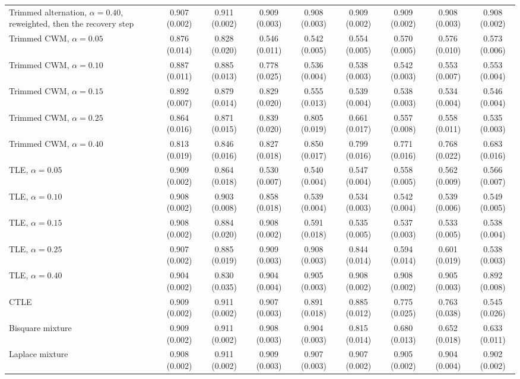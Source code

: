 \begin{table}[htbp]
{\begin{tabular}{lcccccccc}
Trimmed alternation, $\alpha=0.40$, reweighted, then the recovery step & 0.907 (0.002) & 0.911 (0.002) & 0.909 (0.003) & 0.908 (0.003) & 0.909 (0.002) & 0.909 (0.002) & 0.908 (0.003) & 0.908 (0.002) \\
Trimmed CWM, $\alpha=0.05$ & 0.876 (0.014) & 0.828 (0.020) & 0.546 (0.011) & 0.542 (0.005) & 0.554 (0.005) & 0.570 (0.005) & 0.576 (0.010) & 0.573 (0.006) \\
Trimmed CWM, $\alpha=0.10$ & 0.887 (0.011) & 0.885 (0.013) & 0.778 (0.025) & 0.536 (0.004) & 0.538 (0.003) & 0.542 (0.003) & 0.553 (0.007) & 0.553 (0.004) \\
Trimmed CWM, $\alpha=0.15$ & 0.892 (0.007) & 0.879 (0.014) & 0.829 (0.020) & 0.555 (0.013) & 0.539 (0.004) & 0.538 (0.003) & 0.534 (0.004) & 0.546 (0.004) \\
Trimmed CWM, $\alpha=0.25$ & 0.864 (0.016) & 0.871 (0.015) & 0.839 (0.020) & 0.805 (0.019) & 0.661 (0.017) & 0.557 (0.008) & 0.558 (0.011) & 0.535 (0.003) \\
Trimmed CWM, $\alpha=0.40$ & 0.813 (0.019) & 0.846 (0.016) & 0.827 (0.018) & 0.850 (0.017) & 0.799 (0.016) & 0.771 (0.016) & 0.768 (0.022) & 0.683 (0.016) \\
TLE, $\alpha=0.05$ & 0.909 (0.002) & 0.864 (0.018) & 0.530 (0.007) & 0.540 (0.004) & 0.547 (0.004) & 0.558 (0.005) & 0.562 (0.009) & 0.566 (0.007) \\
TLE, $\alpha=0.10$ & 0.908 (0.002) & 0.903 (0.008) & 0.858 (0.018) & 0.539 (0.004) & 0.534 (0.003) & 0.542 (0.004) & 0.539 (0.006) & 0.549 (0.005) \\
TLE, $\alpha=0.15$ & 0.908 (0.002) & 0.884 (0.020) & 0.908 (0.002) & 0.591 (0.018) & 0.535 (0.005) & 0.537 (0.003) & 0.533 (0.005) & 0.538 (0.004) \\
TLE, $\alpha=0.25$ & 0.907 (0.002) & 0.885 (0.019) & 0.909 (0.003) & 0.908 (0.003) & 0.844 (0.014) & 0.594 (0.014) & 0.601 (0.019) & 0.538 (0.003) \\
TLE, $\alpha=0.40$ & 0.904 (0.002) & 0.830 (0.035) & 0.904 (0.004) & 0.905 (0.003) & 0.908 (0.002) & 0.908 (0.002) & 0.905 (0.003) & 0.892 (0.008) \\
CTLE & 0.909 (0.002) & 0.911 (0.002) & 0.907 (0.003) & 0.891 (0.018) & 0.885 (0.012) & 0.775 (0.025) & 0.763 (0.038) & 0.545 (0.026) \\
Bisquare mixture & 0.909 (0.002) & 0.911 (0.002) & 0.908 (0.003) & 0.904 (0.003) & 0.815 (0.014) & 0.680 (0.013) & 0.652 (0.018) & 0.633 (0.011) \\
Laplace mixture & 0.908 (0.002) & 0.911 (0.002) & 0.909 (0.003) & 0.907 (0.003) & 0.907 (0.002) & 0.905 (0.002) & 0.904 (0.004) & 0.902 (0.002) \\

\end{tabular}}
\end{table}
